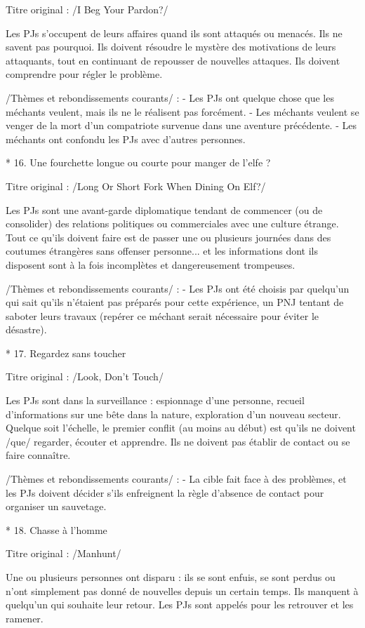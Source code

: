 \begin{enumerate}
Titre original : /I Beg Your Pardon?/

Les PJs s'occupent de leurs affaires quand ils sont attaqués ou menacés. Ils ne savent pas pourquoi. Ils doivent résoudre le mystère des motivations de leurs attaquants, tout en continuant de repousser de nouvelles attaques. Ils doivent comprendre pour régler le problème.

/Thèmes et rebondissements courants/ :
- Les PJs ont quelque chose que les méchants veulent, mais ils ne le réalisent pas forcément.
- Les méchants veulent se venger de la mort d'un compatriote survenue dans une aventure précédente.
- Les méchants ont confondu les PJs avec d'autres personnes.

* 16. Une fourchette longue ou courte pour manger de l'elfe ?

Titre original : /Long Or Short Fork When Dining On Elf?/

Les PJs sont une avant-garde diplomatique tendant de commencer (ou de consolider) des relations politiques ou commerciales avec une culture étrange. Tout ce qu'ils doivent faire est de passer une ou plusieurs journées dans des coutumes étrangères sans offenser personne... et les informations dont ils disposent sont à la fois incomplètes et dangereusement trompeuses.

/Thèmes et rebondissements courants/ :
- Les PJs ont été choisis par quelqu'un qui sait qu'ils n'étaient pas préparés pour cette expérience, un PNJ tentant de saboter leurs travaux (repérer ce méchant serait nécessaire pour éviter le désastre).

* 17. Regardez sans toucher

Titre original : /Look, Don't Touch/

Les PJs sont dans la surveillance : espionnage d'une personne, recueil d'informations sur une bête dans la nature, exploration d'un nouveau secteur. Quelque soit l'échelle, le premier conflit (au moins au début) est qu'ils ne doivent /que/ regarder, écouter et apprendre. Ils ne doivent pas établir de contact ou se faire connaître.

/Thèmes et rebondissements courants/ :
- La cible fait face à des problèmes, et les PJs doivent décider s'ils enfreignent la règle d'absence de contact pour organiser un sauvetage.

* 18. Chasse à l'homme

Titre original : /Manhunt/

Une ou plusieurs personnes ont disparu : ils se sont enfuis, se sont perdus ou n'ont simplement pas donné de nouvelles depuis un certain temps. Ils manquent à quelqu'un qui souhaite leur retour. Les PJs sont appelés pour les retrouver et les ramener.


\end{enumerate}
